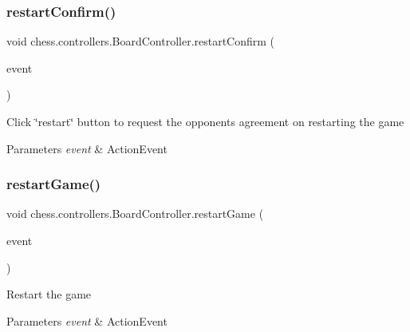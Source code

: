 \subsubsection{\texorpdfstring{restart\+Confirm()}{restartConfirm()}}
{\footnotesize\ttfamily void chess.\+controllers.\+Board\+Controller.\+restart\+Confirm (\begin{DoxyParamCaption}\item[{Action\+Event}]{event }\end{DoxyParamCaption})}

Click \char`\"{}restart\char`\"{} button to request the opponent\textquotesingle{}s agreement on restarting the game


\begin{DoxyParams}{Parameters}
{\em event} & Action\+Event \\
\hline
\end{DoxyParams}
\mbox{\label{classchess_1_1controllers_1_1_board_controller_a72b59496c1c41ab9219f24ef95643fef}} 
\subsubsection{\texorpdfstring{restart\+Game()}{restartGame()}}
{\footnotesize\ttfamily void chess.\+controllers.\+Board\+Controller.\+restart\+Game (\begin{DoxyParamCaption}\item[{Action\+Event}]{event }\end{DoxyParamCaption})}

Restart the game


\begin{DoxyParams}{Parameters}
{\em event} & Action\+Event \\
\hline
\end{DoxyParams}
\mbox{\label{classchess_1_1controllers_1_1_board_controller_a6b6dfa8a50a88faa082014c01b0b49cf}} 
